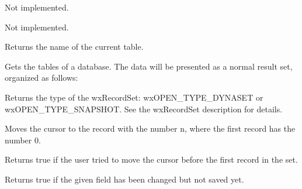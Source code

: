 
Not implemented.
  


Not implemented.



Returns the name of the current table.
  


Gets the tables of a database. The data will be presented as a normal result
set, organized as follows:

\begin{twocollist}\itemsep=0pt
\end{twocollist}



Returns the type of the wxRecordSet: wxOPEN\_TYPE\_DYNASET or
wxOPEN\_TYPE\_SNAPSHOT. See the wxRecordSet description for details.



Moves the cursor to the record with the number n, where  the first record
has the number 0.
  


Returns true if the user tried to move the cursor before the first record
in the set.



Returns true if the given field has been changed but not saved yet.


